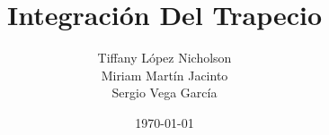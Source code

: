 \documentclass{article}
\begin{document}
  \title{Integración Del Trapecio}
  \author{Tiffany López Nicholson \\ Miriam Martín Jacinto \\ Sergio Vega García}
  \date{\today}
  \maketitle
\end{document}
